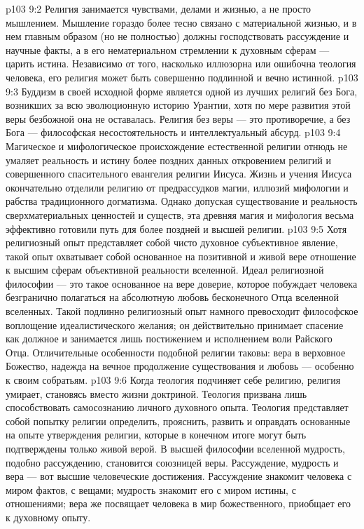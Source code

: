 \vs p103 9:2 Религия занимается чувствами, делами и жизнью, а не просто мышлением. Мышление гораздо более тесно связано с материальной жизнью, и в нем главным образом (но не полностью) должны господствовать рассуждение и научные факты, а в его нематериальном стремлении к духовным сферам --- царить истина. Независимо от того, насколько иллюзорна или ошибочна теология человека, его религия может быть совершенно подлинной и вечно истинной.
\vs p103 9:3 Буддизм в своей исходной форме является одной из лучших религий без Бога, возникших за всю эволюционную историю Урантии, хотя по мере развития этой веры безбожной она не оставалась. Религия без веры --- это противоречие, а без Бога --- философская несостоятельность и интеллектуальный абсурд.
\vs p103 9:4 Магическое и мифологическое происхождение естественной религии отнюдь не умаляет реальность и истину более поздних данных откровением религий и совершенного спасительного евангелия религии Иисуса. Жизнь и учения Иисуса окончательно отделили религию от предрассудков магии, иллюзий мифологии и рабства традиционного догматизма. Однако допуская существование и реальность сверхматериальных ценностей и существ, эта древняя магия и мифология весьма эффективно готовили путь для более поздней и высшей религии.
\vs p103 9:5 Хотя религиозный опыт представляет собой чисто духовное субъективное явление, такой опыт охватывает собой основанное на позитивной и живой вере отношение к высшим сферам объективной реальности вселенной. Идеал религиозной философии --- это такое основанное на вере доверие, которое побуждает человека безгранично полагаться на абсолютную любовь бесконечного Отца вселенной вселенных. Такой подлинно религиозный опыт намного превосходит философское воплощение идеалистического желания; он действительно принимает спасение как должное и занимается лишь постижением и исполнением воли Райского Отца. Отличительные особенности подобной религии таковы: вера в верховное Божество, надежда на вечное продолжение существования и любовь --- особенно к своим собратьям.
\vs p103 9:6 \pc Когда теология подчиняет себе религию, религия умирает, становясь вместо жизни доктриной. Теология призвана лишь способствовать самосознанию личного духовного опыта. Теология представляет собой попытку религии определить, прояснить, развить и оправдать основанные на опыте утверждения религии, которые в конечном итоге могут быть подтверждены только живой верой. В высшей философии вселенной мудрость, подобно рассуждению, становится союзницей веры. Рассуждение, мудрость и вера --- вот высшие человеческие достижения. Рассуждение знакомит человека с миром фактов, с вещами; мудрость знакомит его с миром истины, с отношениями; вера же посвящает человека в мир божественного, приобщает его к духовному опыту.
